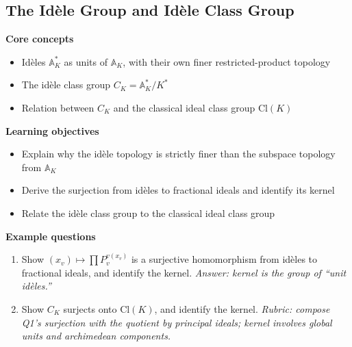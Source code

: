\documentclass[11pt]{article}
\newcommand{\A}{\mathbb{A}}
\begin{document}
\subsection{The Idèle Group and Idèle Class Group}
\textbf{Core concepts}
\begin{itemize}[noitemsep]
  \item Idèles $\A_K^*$ as units of $\A_K$, with their own finer restricted-product topology
  \item The idèle class group $C_K = \A_K^*/K^*$
  \item Relation between $C_K$ and the classical ideal class group $\mathrm{Cl}(K)$
\end{itemize}
\textbf{Learning objectives}
\begin{itemize}[noitemsep]
  \item Explain why the idèle topology is strictly finer than the subspace topology from $\A_K$
  \item Derive the surjection from idèles to fractional ideals and identify its kernel
  \item Relate the idèle class group to the classical ideal class group
\end{itemize}
\textbf{Example questions}
\begin{enumerate}[noitemsep]
  \item[Q1 (foundational).] Show $(x_v) \mapsto \prod P_v^{v(x_v)}$ is a surjective homomorphism from idèles to fractional ideals, and identify the kernel. \emph{Answer: kernel is the group of ``unit idèles.''}
  \item[Q2 (advanced).] Show $C_K$ surjects onto $\mathrm{Cl}(K)$, and identify the kernel. \emph{Rubric: compose Q1's surjection with the quotient by principal ideals; kernel involves global units and archimedean components.}
\end{enumerate}

\end{document}
